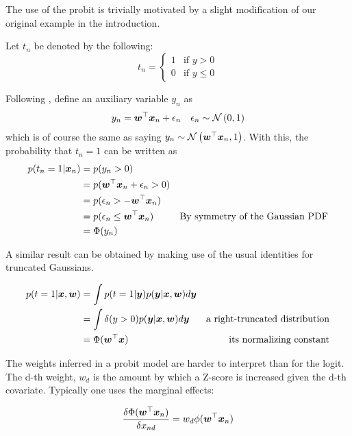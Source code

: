 The use of the probit is trivially motivated by a slight modification of our original example in the introduction.

Let $t_n$ be denoted by the following:
\begin{equation}
    t_n = \left\{ \begin{matrix}
        1 & \text{if } y > 0 \\
        0 & \text{if } y \leq 0
    \end{matrix} \right.
\end{equation}


Following \cite{AlbertChib1994}, define an auxiliary variable $y_n$ as
\begin{align}
y_n & = \bm w^\top \bm x_n + \epsilon_n & \epsilon_n \sim \mathcal{N} \left( {0}, {1} \right)
\end{align}
which is of course the same as saying $y_n \sim \mathcal{N} \left( {\bm w^\top\bm x_n}, {1} \right)$. With this, the probability that $t_n = 1$ can be written as
\begin{align}
p(t_n = 1 | \bm x_n) & = p (y_n > 0) \\
& = p(\bm w^\top\bm x_n + \epsilon_n > 0) \\
& = p(\epsilon_n > - \bm w^\top\bm x_n) \\
& = p(\epsilon_n \leq \bm w^\top\bm x_n) & \text{By symmetry of the Gaussian PDF} \\
& = \Phi(y_n)
\end{align}

A similar result can be obtained by making use of the usual identities for truncated Gaussians.

\begin{align}
p(t = 1 | \bm x, \bm w) & = \int p(t = 1 | \bm y) p(\bm y | \bm x, \bm w) d\bm y \\
 & = \int \delta(y > 0) p(\bm y | \bm x, \bm w) d\bm y & \text{a right-truncated distribution} \\
 & = \Phi(\bm w^\top\bm x) & \text{its normalizing constant}
\end{align}


The weights inferred in a probit model are harder to interpret than for the logit. The d-th weight, $w_d$ is the amount by which a Z-score is increased given the d-th covariate. Typically one uses the marginal effects:

\begin{equation}
\frac{\delta \Phi(\bm w^\top\bm x_n)}{\delta x_{nd}} = w_d \phi(\bm w^\top\bm x_n)
\end{equation}

